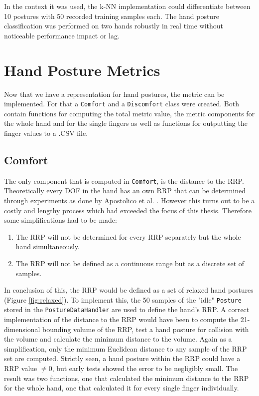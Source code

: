 In the context it was used, the k-NN implementation could differentiate between 10 postures with 50 recorded training samples each. The hand posture classification was performed on two hands robustly in real time without noticeable performance impact or lag. 


\section{Hand Posture Metrics}\label{chapter:handosturemetric}

Now that we have a representation for hand postures, the metric can be implemented. For that a \texttt{Comfort} and a \texttt{Discomfort} class were created. Both contain functions for computing the total metric value, the metric components for the whole hand and for the single fingers as well as functions for outputting the finger values to a .CSV file. 

\subsection{Comfort}

The only component that is computed in \texttt{Comfort}, is the distance to the RRP. Theoretically every DOF in the hand has an own RRP that can be determined through experiments as done by Apostolico et al. \cite{apostolico2014postural}. However this turns out to be a costly and lengthy process which had exceeded the focus of this thesis. Therefore some simplifications had to be made:

\begin{enumerate}
	\item The RRP will not be determined for every RRP separately but the whole hand simultaneously.
	\item The RRP will not be defined as a continuous range but as a discrete set of samples.
\end{enumerate}

In conclusion of this, the RRP would be defined as a set of relaxed hand postures (Figure \ref{fig:relaxed}). To implement this, the 50 samples of the "idle" \texttt{Posture} stored in the \texttt{PostureDataHandler} are used to define the hand's RRP. A correct implementation of the distance to the RRP would have been to compute the 21-dimensional bounding volume of the RRP, test a hand posture for collision with the volume and calculate the minimum distance to the volume. Again as a simplification, only the minimum Euclidean distance to any sample of the RRP set are computed. Strictly seen, a hand posture within the RRP could have a RRP value \begin{math}\not= 0\end{math}, 
but early tests showed the error to be negligibly small.
The result was two functions, one that calculated the minimum distance to the RRP for the whole hand, one that calculated it for every single finger individually.

